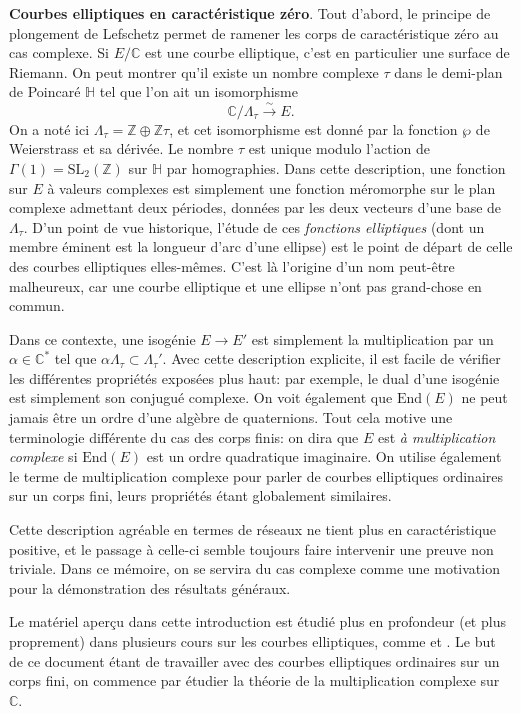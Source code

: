 \documentclass[11pt,a4paper]{article}
\newcommand{\Z}{\mathbb{Z}}
\newcommand{\C}{\mathbb{C}}
\renewcommand{\H}{\mathbb{H}}
\newcommand{\vers}{\longrightarrow}
\newcommand{\End}{\mathrm{End}}
\renewcommand{\v}{\vspace{5mm}}
\theoremstyle{definition}
\begin{document}
\v

\textbf{Courbes elliptiques en caractéristique zéro}. Tout d'abord, le principe de plongement de Lefschetz permet de ramener les corps de caractéristique zéro au cas complexe. Si $E/\C$ est une courbe elliptique, c'est en particulier une surface de Riemann. On peut montrer qu'il existe un nombre complexe $\tau$ dans le demi-plan de Poincaré $\H$ tel que l'on ait un isomorphisme
$$\C/\Lambda_\tau \overset{\sim}{\vers} E.$$
On a noté ici $\Lambda_\tau = \Z\oplus \Z\tau$, et cet isomorphisme est donné par la fonction $\wp$ de Weierstrass et sa dérivée. Le nombre $\tau$ est unique modulo l'action de $\Gamma(1) = \mathrm{SL}_2(\Z)$ sur $\H$ par homographies. Dans cette description, une fonction sur $E$ à valeurs complexes est simplement une fonction méromorphe sur le plan complexe admettant deux périodes, données par les deux vecteurs d'une base de $\Lambda_\tau$. D'un point de vue historique, l'étude de ces \emph{fonctions elliptiques} (dont un membre éminent est la longueur d'arc d'une ellipse) est le point de départ de celle des courbes elliptiques elles-mêmes. C'est là l'origine d'un nom peut-être malheureux, car une courbe elliptique et une ellipse n'ont pas grand-chose en commun.

Dans ce contexte, une isogénie $E\vers E'$ est simplement la multiplication par un $\alpha\in \C^*$ tel que $\alpha \Lambda_\tau \subset \Lambda_\tau'$. Avec cette description explicite, il est facile de vérifier les différentes propriétés exposées plus haut: par exemple, le dual d'une isogénie est simplement son conjugué complexe. On voit également que $\End(E)$ ne peut jamais être un ordre d'une algèbre de quaternions. Tout cela motive une terminologie différente du cas des corps finis: on dira que $E$ est \emph{à multiplication complexe} si $\End(E)$ est un ordre quadratique imaginaire.
On utilise également le terme de multiplication complexe pour parler de courbes elliptiques ordinaires sur un corps fini, leurs propriétés étant globalement similaires.

Cette description agréable en termes de réseaux ne tient plus en caractéristique positive, et le passage à celle-ci semble toujours faire intervenir une preuve non triviale. Dans ce mémoire, on se servira du cas complexe comme une motivation pour la démonstration des résultats généraux.

\v

Le matériel aperçu dans cette introduction est étudié plus en profondeur (et plus proprement) dans plusieurs cours sur les courbes elliptiques, comme \cite{Nekovar} et \cite{Stroh}.
Le but de ce document étant de travailler avec des courbes elliptiques ordinaires sur un corps fini, on commence par étudier la théorie de la multiplication complexe sur $\C$.
\end{document}
